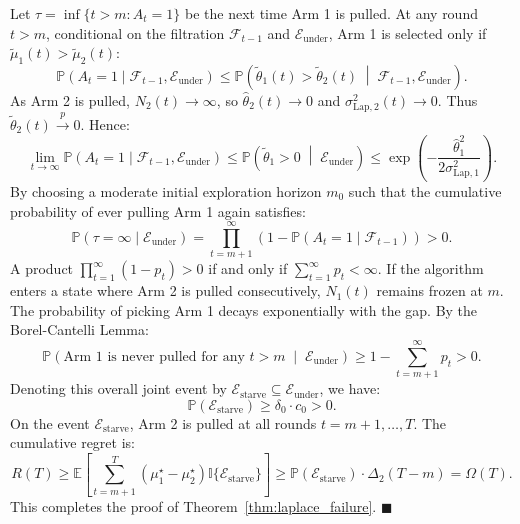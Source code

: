 \documentclass[twoside]{article}
\begin{document}
Let $\tau = \inf\{ t > m : A_t = 1 \}$ be the next time Arm 1 is pulled. At any round $t > m$, conditional on the filtration $\mathcal{F}_{t-1}$ and $\mathcal{E}_{\text{under}}$, Arm 1 is selected only if $\tilde{\mu}_1(t) > \tilde{\mu}_2(t)$:
\begin{equation}
\mathbb{P}(A_t = 1 \mid \mathcal{F}_{t-1}, \mathcal{E}_{\text{under}}) \le \mathbb{P}\left(\tilde{\theta}_1(t) > \tilde{\theta}_2(t) \;\middle|\; \mathcal{F}_{t-1}, \mathcal{E}_{\text{under}}\right).
\end{equation}
As Arm 2 is pulled, $N_2(t) \to \infty$, so $\hat{\theta}_2(t) \to 0$ and $\sigma_{\text{Lap}, 2}^2(t) \to 0$. Thus $\tilde{\theta}_2(t) \xrightarrow{p} 0$. Hence:
\begin{equation}
\lim_{t \to \infty} \mathbb{P}(A_t = 1 \mid \mathcal{F}_{t-1}, \mathcal{E}_{\text{under}}) \le \mathbb{P}\left(\tilde{\theta}_1 > 0 \;\middle|\; \mathcal{E}_{\text{under}}\right) \le \exp\left( - \frac{\hat{\theta}_1^2}{2 \sigma_{\text{Lap}, 1}^2} \right).
\end{equation}
By choosing a moderate initial exploration horizon $m_0$ such that the cumulative probability of ever pulling Arm 1 again satisfies:
\begin{equation}
\mathbb{P}(\tau = \infty \mid \mathcal{E}_{\text{under}}) = \prod_{t=m+1}^\infty \left( 1 - \mathbb{P}(A_t = 1 \mid \mathcal{F}_{t-1}) \right) > 0.
\end{equation}
A product $\prod_{t=1}^\infty (1 - p_t) > 0$ if and only if $\sum_{t=1}^\infty p_t < \infty$. If the algorithm enters a state where Arm 2 is pulled consecutively, $N_1(t)$ remains frozen at $m$. The probability of picking Arm 1 decays exponentially with the gap. By the Borel-Cantelli Lemma:
\begin{equation}
\mathbb{P}\left( \text{Arm 1 is never pulled for any } t > m \;\middle|\; \mathcal{E}_{\text{under}} \right) \ge 1 - \sum_{t=m+1}^\infty p_t > 0.
\end{equation}
Denoting this overall joint event by $\mathcal{E}_{\text{starve}} \subseteq \mathcal{E}_{\text{under}}$, we have:
\begin{equation}
\mathbb{P}(\mathcal{E}_{\text{starve}}) \ge \delta_0 \cdot c_0 > 0.
\end{equation}
On the event $\mathcal{E}_{\text{starve}}$, Arm 2 is pulled at all rounds $t = m+1, \dots, T$. The cumulative regret is:
\begin{equation}
R(T) \ge \mathbb{E}\left[ \sum_{t=m+1}^T (\mu_1^\star - \mu_2^\star) \mathbb{I}\{\mathcal{E}_{\text{starve}}\} \right] \ge \mathbb{P}(\mathcal{E}_{\text{starve}}) \cdot \Delta_2 (T - m) = \Omega(T).
\end{equation}
This completes the proof of Theorem~\ref{thm:laplace_failure}. \hfill $\blacksquare$
\end{document}
